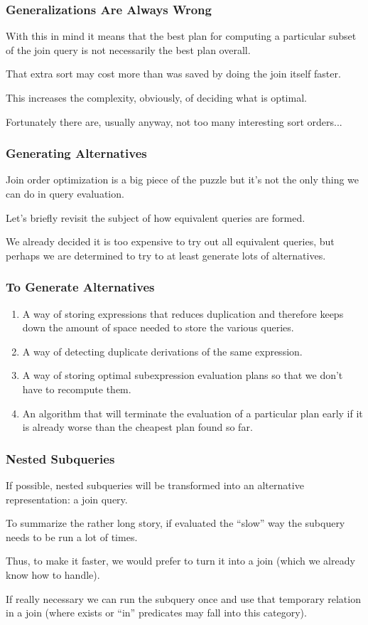 \begin{frame}
\frametitle{Generalizations Are Always Wrong}

With this in mind it means that the best plan for computing a particular subset of the join query is not necessarily the best plan overall. 

That extra sort may cost more than was saved by doing the join itself faster. 

This increases the complexity, obviously, of deciding what is optimal. 

Fortunately there are, usually anyway, not too many interesting sort orders...


\end{frame}

\begin{frame}
\frametitle{Generating Alternatives}

Join order optimization is a big piece of the puzzle but it's not the only thing we can do in query evaluation. 

Let's briefly revisit the subject of how equivalent queries are formed. 

We already decided it is too expensive to try out all equivalent queries, but perhaps we are determined to try to at least generate lots of alternatives.

\end{frame}

\begin{frame}
\frametitle{To Generate Alternatives}

\begin{enumerate}
	\item A way of storing expressions that reduces duplication and therefore keeps down the amount of space needed to store the various queries.
	\item A way of detecting duplicate derivations of the same expression.
	\item A way of storing optimal subexpression evaluation plans so that we don't have to recompute them.
	\item An algorithm that will terminate the evaluation of a particular plan early if it is already worse than the cheapest plan found so far.
\end{enumerate}


\end{frame}


\begin{frame}
\frametitle{Nested Subqueries}

If possible, nested subqueries will be transformed into an alternative representation: a join query. 

To summarize the rather long story, if evaluated the ``slow'' way the subquery needs to be run a lot of times. 

Thus, to make it faster, we would prefer to turn it into a join (which we already know how to handle).

If really necessary we can run the subquery once and use that temporary relation in a join (where exists or ``in'' predicates may fall into this category).


\end{frame}

